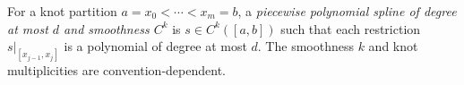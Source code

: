 
For a knot partition $a=x_0<\cdots<x_m=b$, a \emph{piecewise polynomial spline of degree at most $d$ and smoothness $C^k$} is $s\in C^k([a,b])$ such that each restriction $s|_{[x_{j-1},x_j]}$ is a polynomial of degree at most $d$. The smoothness $k$ and knot multiplicities are convention-dependent.
